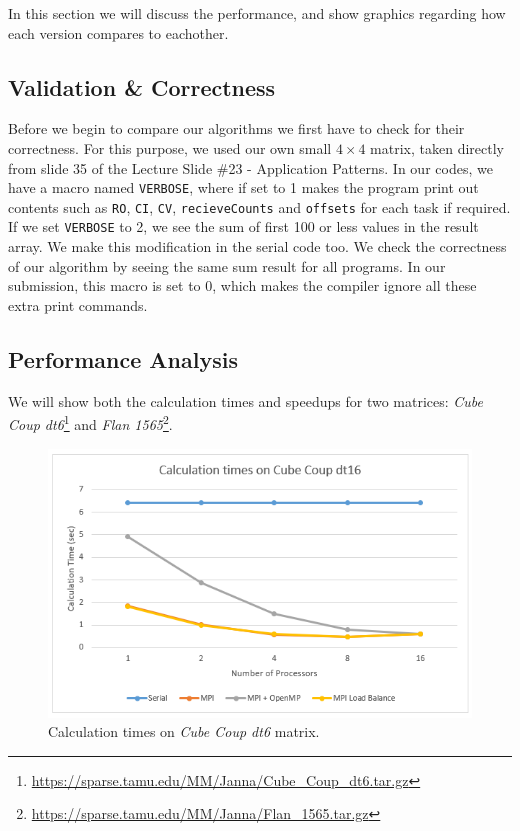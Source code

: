 \documentclass[12pt,reqno]{amsart}
\newcommand{\code}[1]{\texttt{#1}}
\begin{document}
In this section we will discuss the performance, and show graphics regarding how each version compares to eachother.

\subsection{Validation \& Correctness}
Before we begin to compare our algorithms we first have to check for their correctness. For this purpose, we used our own small $4\times4$ matrix, taken directly from slide 35 of the Lecture Slide \#23 - Application Patterns. In our codes, we have a macro named \code{VERBOSE}, where if set to 1 makes the program print out contents such as \code{RO}, \code{CI}, \code{CV}, \code{recieveCounts} and \code{offsets} for each task if required. If we set \code{VERBOSE} to 2, we see the sum of first 100 or less values in the result array. We make this modification in the serial code too. We check the correctness of our algorithm by seeing the same sum result for all programs. In our submission, this macro is set to 0, which makes the compiler ignore all these extra print commands.

\subsection{Performance Analysis}
We will show both the calculation times and speedups for two matrices: \textit{Cube Coup dt6}\footnote{\url{https://sparse.tamu.edu/MM/Janna/Cube\_Coup\_dt6.tar.gz}} and \textit{Flan 1565}\footnote{\url{https://sparse.tamu.edu/MM/Janna/Flan\_1565.tar.gz}}.

\begin{figure}[h]
\centering
\includegraphics[width=\linewidth]{calc_coup.png}
\caption{Calculation times on \textit{Cube Coup dt6} matrix.}
\label{fig:calc_coup}
\end{figure}
\end{document}
